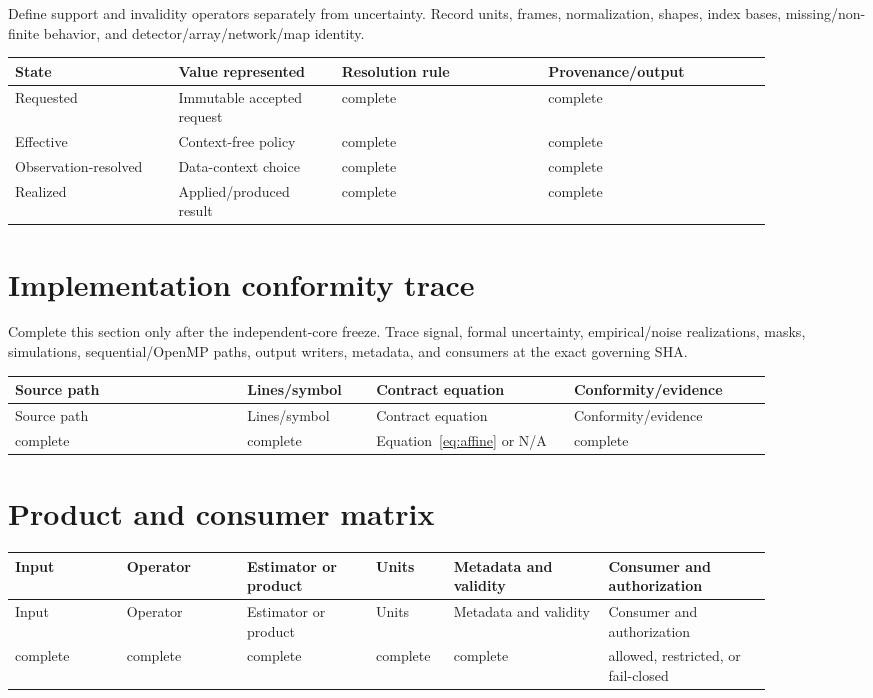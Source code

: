 \documentclass[11pt]{article}
\begin{document}
Define support and invalidity operators separately from uncertainty. Record
units, frames, normalization, shapes, index bases, missing/non-finite behavior,
and detector/array/network/map identity.

\begin{longtable}{L{0.19\linewidth}L{0.19\linewidth}L{0.24\linewidth}L{0.26\linewidth}}
\toprule
State & Value represented & Resolution rule & Provenance/output\\
\midrule
Requested & Immutable accepted request & complete & complete\\
Effective & Context-free policy & complete & complete\\
Observation-resolved & Data-context choice & complete & complete\\
Realized & Applied/produced result & complete & complete\\
\bottomrule
\end{longtable}

\section{Implementation conformity trace}

Complete this section only after the independent-core freeze. Trace signal,
formal uncertainty, empirical/noise realizations, masks, simulations,
sequential/OpenMP paths, output writers, metadata, and consumers at the exact
governing SHA.

\begin{longtable}{L{0.27\linewidth}L{0.15\linewidth}L{0.23\linewidth}L{0.23\linewidth}}
\toprule
Source path & Lines/symbol & Contract equation & Conformity/evidence\\
\midrule
\endfirsthead
\toprule
Source path & Lines/symbol & Contract equation & Conformity/evidence\\
\midrule
\endhead
complete & complete & Equation~\eqref{eq:affine} or N/A & complete\\
\bottomrule
\end{longtable}

\section{Product and consumer matrix}

\begin{longtable}{L{0.13\linewidth}L{0.14\linewidth}L{0.15\linewidth}L{0.09\linewidth}L{0.18\linewidth}L{0.19\linewidth}}
\toprule
Input & Operator & Estimator or product & Units & Metadata and validity & Consumer and
authorization\\
\midrule
\endfirsthead
\toprule
Input & Operator & Estimator or product & Units & Metadata and validity & Consumer and
authorization\\
\midrule
\endhead
complete & complete & complete & complete & complete &
allowed, restricted, or fail-closed\\
\bottomrule
\end{longtable}
\end{document}
